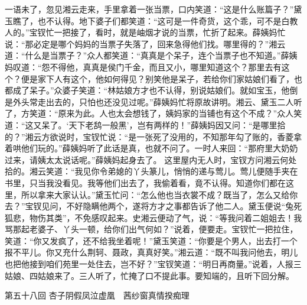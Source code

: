 \documentclass[12pt,oneside]{book}
\begin{document}
一语未了，忽见湘云走来，手里拿着一张当票，口内笑道：“这是什么账篇子？”黛玉瞧了，也不认得。地下婆子们都笑道：“这可是一件奇货，这个乖，可不是白教人的。”宝钗忙一把接了，看时，就是岫烟才说的当票，忙折了起来。薛姨妈忙说：“那必定是哪个妈妈的当票子失落了，回来急得他们找。哪里得的？”湘云道：“什么是当票子？”众人都笑道：“真真是个呆子，连个当票子也不知道。”薛姨妈叹道：“怨不得他，真真是侯门千金，而且又小，哪里知道这个？那里去有这个？便是家下人有这个，他如何得见？别笑他是呆子，若给你们家姑娘们看了，也都成了呆子。”众婆子笑道：“林姑娘方才也不认得，别说姑娘们。就如宝玉，他倒是外头常走出去的，只怕也还没见过呢。”薛姨妈忙将原故讲明。湘云、黛玉二人听了，方笑道：“原来为此。人也太会想钱了，姨妈家的当铺也有这个不成？”众人笑道：“这又呆了。‘天下老鸹一般黑’，岂有两样的！”薛姨妈因又问：“是哪里拾的？”湘云方欲说时，宝钗忙说：“是一张死了没用的，不知那年勾了账的，香菱拿着哄他们玩的。”薛姨妈听了此话是真，也就不问了。一时人来回：“那府里大奶奶过来，请姨太太说话呢。”薛姨妈起身去了。
这里屋内无人时，宝钗方问湘云何处拾的。湘云笑道：“我见你令弟媳的丫头篆儿，悄悄的递与莺儿。莺儿便随手夹在书里，只当我没看见。我等他们出去了，我偷着看，竟不认得。知道你们都在这里，所以拿来大家认认。”黛玉忙问：“怎么他也当衣裳不成？既当了，怎么又给你去？”宝钗见问，不好隐瞒他两个，遂将方才之事都告诉了他二人。黛玉便说“兔死狐悲，物伤其类”，不免感叹起来。史湘云便动了气，说：“等我问着二姐姐去！我骂那起老婆子、丫头一顿，给你们出气何如？”说着，便要走。宝钗忙一把拉住，笑道：“你又发疯了，还不给我坐着呢！”黛玉笑道：“你要是个男人，出去打一个报不平儿。你又充什么荆轲、聂政，真真好笑。”湘云道：“既不叫我问他去，明儿也把他接到咱们苑里一处住去，岂不好？”宝钗笑道：“明日再商量。”说着，人报三姑娘、四姑娘来了。三人听了，忙掩了口不提此事。要知端的，且听下回分解。


 
第五十八回  杏子阴假凤泣虚凰　茜纱窗真情揆痴理
\end{document}
